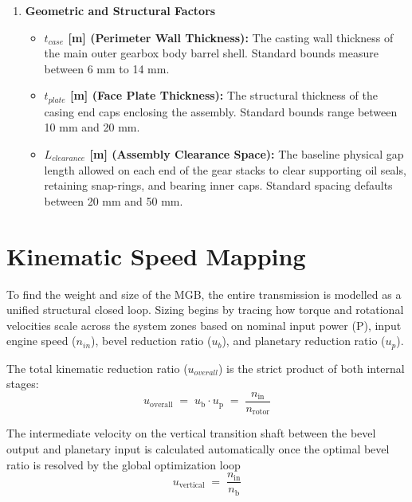 \begin{enumerate}
            \item \textbf{Geometric and Structural Factors}\par
            	\begin{itemize}
			        \item \textbf{$t_{case}$ [m] (Perimeter Wall Thickness):} The casting wall thickness of the main outer gearbox body barrel shell. Standard bounds measure between 6 mm to 14 mm.
			        \item \textbf{$t_{plate}$ [m] (Face Plate Thickness):} The structural thickness of the casing end caps enclosing the assembly. Standard bounds range between 10 mm and 20 mm.
			        \item \textbf{$L_{clearance}$ [m] (Assembly Clearance Space):} The baseline physical gap length allowed on each end of the gear stacks to clear supporting oil seals, retaining snap-rings, and bearing inner caps. Standard spacing defaults between 20 mm and 50 mm.
                \end{itemize}
		\end{enumerate}

\section{Kinematic Speed Mapping}
    To find the weight and size of the MGB, the entire transmission is modelled as a unified 
    structural closed loop. Sizing begins by tracing how torque and rotational velocities scale 
    across the system zones based on nominal input power (P), input engine speed ($n_{in}$), bevel 
    reduction ratio ($u_{b}$), and planetary reduction ratio ($u_{p}$). 

    The total kinematic reduction ratio ($u_{overall}$) is the strict product of both internal stages:
        \begin{equation}
            \label{eq:totalkinematicreductionratio}
            u_{\text{overall}}
            \;=\;
            u_{\text{b}} \cdot u_{\text{p}}
            \;=\;
            \frac{n_{\text{in}}}{n_{\text{rotor}}}
        \end{equation}

    The intermediate velocity on the vertical transition shaft between the bevel output and planetary input is 
    calculated automatically once the optimal bevel ratio is resolved by the global optimization loop
        \begin{equation}
            \label{eq:optimalbevelratio}
            u_{\text{vertical}}
            \;=\;
            \frac{n_{\text{in}}}{n_{\text{b}}}
        \end{equation}

